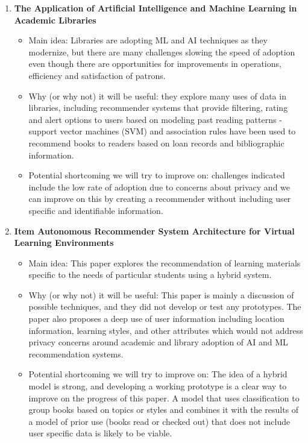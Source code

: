 \begin{enumerate}[label=(\arabic*)]
\begin{itemize}
    \end{itemize}
    \item \cite{mupaikwa2025application} \textbf{The Application of Artificial Intelligence and Machine Learning in Academic Libraries}
    \begin{itemize}
        \item Main idea: Libraries are adopting ML and AI techniques as they modernize, but there are many challenges slowing the speed of adoption even though there are opportunities for improvements in operations, efficiency and satisfaction of patrons.
        \item Why (or why not) it will be useful: they explore many uses of data in libraries, including recommender systems that provide filtering, rating and alert options to users based on modeling past reading patterns - support vector machines (SVM) and association rules have been used to recommend books to readers based on loan records and bibliographic information.
        \item Potential shortcoming we will try to improve on: challenges indicated include the low rate of adoption due to concerns about privacy and we can improve on this by creating a recommender without including user specific and identifiable information.
    \end{itemize}
    \item \cite{monsalve2020autonomous} \textbf{Item Autonomous Recommender System Architecture for Virtual Learning Environments}
    \begin{itemize}
        \item Main idea: This paper explores the recommendation of learning materials specific to the needs of particular students using a hybrid system.
        \item Why (or why not) it will be useful: This paper is mainly a discussion of possible techniques, and they did not develop or test any prototypes. The paper also proposes a deep use of user information including location information, learning styles, and other attributes which would not address privacy concerns around academic and library adoption of AI and ML recommendation systems.
        \item Potential shortcoming we will try to improve on: The idea of a hybrid model is strong, and developing a working prototype is a clear way to improve on the progress of this paper. A model that uses classification to group books based on topics or styles and combines it with the results of a model of prior use (books read or checked out) that does not include user specific data is likely to be viable.

\end{itemize}
\end{enumerate}
